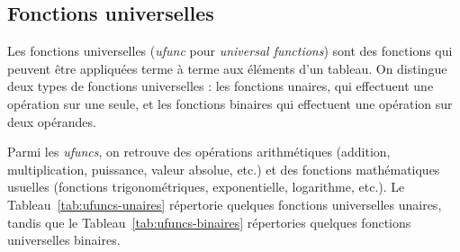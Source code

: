 \documentclass[12pt,]{book}
\numberwithin{equation}{section}
\numberwithin{countremarque}{section}
\begin{document}
\subsection{Fonctions universelles}\label{fonctions-universelles}

Les fonctions universelles (\emph{ufunc} pour \emph{universal
functions}) sont des fonctions qui peuvent être appliquées terme à terme
aux éléments d'un tableau. On distingue deux types de fonctions
universelles : les fonctions unaires, qui effectuent une opération sur
une seule, et les fonctions binaires qui effectuent une opération sur
deux opérandes.

Parmi les \emph{ufuncs}, on retrouve des opérations arithmétiques
(addition, multiplication, puissance, valeur absolue, etc.) et des
fonctions mathématiques usuelles (fonctions trigonométriques,
exponentielle, logarithme, etc.). Le Tableau~\ref{tab:ufuncs-unaires}
répertorie quelques fonctions universelles unaires, tandis que le
Tableau~\ref{tab:ufuncs-binaires} répertories quelques fonctions
universelles binaires.
\end{document}
